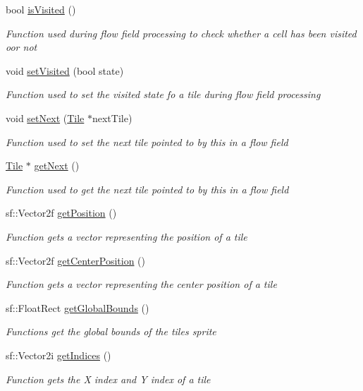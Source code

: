 \begin{DoxyCompactItemize}
bool \mbox{\hyperlink{class_tile_a980db52575b7707886daaf3fcb925bb7}{is\+Visited}} ()
\begin{DoxyCompactList}\small\item\em Function used during flow field processing to check whether a cell has been visited oor not \end{DoxyCompactList}\item 
void \mbox{\hyperlink{class_tile_a9df4805affe8338658a3cfb683a38d20}{set\+Visited}} (bool state)
\begin{DoxyCompactList}\small\item\em Function used to set the visited state fo a tile during flow field processing \end{DoxyCompactList}\item 
void \mbox{\hyperlink{class_tile_aaac2503794e22ce2fb2911dc1951b87f}{set\+Next}} (\mbox{\hyperlink{class_tile}{Tile}} $\ast$next\+Tile)
\begin{DoxyCompactList}\small\item\em Function used to set the next tile pointed to by {\itshape this} in a flow field \end{DoxyCompactList}\item 
\mbox{\hyperlink{class_tile}{Tile}} $\ast$ \mbox{\hyperlink{class_tile_a43a4d61ae6e7e98c4a37ae525151a0e9}{get\+Next}} ()
\begin{DoxyCompactList}\small\item\em Function used to get the next tile pointed to by {\itshape this} in a flow field \end{DoxyCompactList}\item 
sf\+::\+Vector2f \mbox{\hyperlink{class_tile_afd69da1519691d4f82bfe0534db4f01c}{get\+Position}} ()
\begin{DoxyCompactList}\small\item\em Function gets a vector representing the position of a tile \end{DoxyCompactList}\item 
sf\+::\+Vector2f \mbox{\hyperlink{class_tile_a5885cec63f2e1bb1d2eccc927b606184}{get\+Center\+Position}} ()
\begin{DoxyCompactList}\small\item\em Function gets a vector representing the center position of a tile \end{DoxyCompactList}\item 
sf\+::\+Float\+Rect \mbox{\hyperlink{class_tile_a7bd5a68ec8be3d8bd46ad109bfc7fb08}{get\+Global\+Bounds}} ()
\begin{DoxyCompactList}\small\item\em Functions get the global bounds of the tile\textquotesingle{}s sprite \end{DoxyCompactList}\item 
sf\+::\+Vector2i \mbox{\hyperlink{class_tile_a34aba68a8504064fbed9fb9eeec98c6b}{get\+Indices}} ()
\begin{DoxyCompactList}\small\item\em Function gets the X index and Y index of a tile \end{DoxyCompactList}\end{DoxyCompactItemize}


